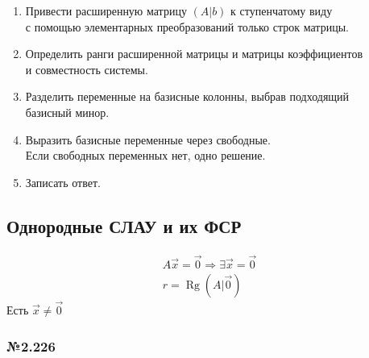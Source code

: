 \documentclass{article}
\DeclareMathOperator*{\Rg}{Rg}
\begin{document}
\begin{enumerate}
	\item Привести расширенную матрицу $(A | b)$ к ступенчатому виду \\
	с помощью элементарных преобразований только строк матрицы.
	\item Определить ранги расширенной матрицы и матрицы коэффициентов \\
	и совместность системы.
	\item Разделить переменные на базисные колонны, выбрав подходящий \\
	базисный минор.
	\item Выразить базисные переменные через свободные. \\
	Если свободных переменных нет, одно решение.
	\item Записать ответ.
\end{enumerate}

\subsection{Однородные СЛАУ и их ФСР}

\begin{gather*}
	A\vec{x} = \vec{0} \Rightarrow \exists \vec{x} = \vec{0} \\
	r = \Rg{(A | \vec{0})}
\end{gather*}
Есть $\vec{x} \ne \vec{0}$

\subsubsection*{№2.226}
\end{document}
